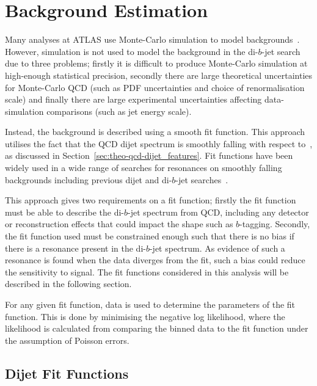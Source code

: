 

\section{Background Estimation}
\label{sec:bkg-fit}

Many analyses at ATLAS use Monte-Carlo simulation
to model backgrounds~\cite{obj-Hbb}.
However, simulation is not used to model the
background in the di-$b$-jet search due to three problems;
firstly it is difficult to produce Monte-Carlo simulation at high-enough statistical precision,
secondly there are large theoretical uncertainties for Monte-Carlo QCD
(such as PDF uncertainties and choice of renormalisation scale)
and finally there are large experimental uncertainties affecting
data-simulation comparisons (such as jet energy scale).

Instead, the background is described using a smooth fit function.
This approach utilises the fact that the QCD dijet spectrum
is smoothly falling with respect to~\mjj,
as discussed in Section~\ref{sec:theo-qcd-dijet_features}.
Fit functions have been widely used
in a wide range of searches for resonances on smoothly falling backgrounds
including previous dijet and di-$b$-jet searches~\cite{dijet-mori16_paper,dibjet-mori16_paper,bkg-higgs_gammagamma}.

This approach gives two requirements on a fit function;
firstly the fit function must be able to describe the di-$b$-jet spectrum from QCD,
including any detector or reconstruction effects that could impact the shape such as $b$-tagging.
Secondly,  the fit function used must be constrained enough
such that there is no bias if there is a resonance present in the di-$b$-jet spectrum.
As evidence of such a resonance is found when the data diverges from the fit,
such a bias could reduce the sensitivity to signal.
The fit functions considered in this analysis will be described in the following section.

For any given fit function, 
data is used to determine the parameters of the fit function.
This is done by minimising the negative log likelihood,
where the likelihood is calculated from comparing
the binned data to the fit function
under the assumption of Poisson errors.

\subsection{Dijet Fit Functions}
\label{sec:bkg-bkg_func}

